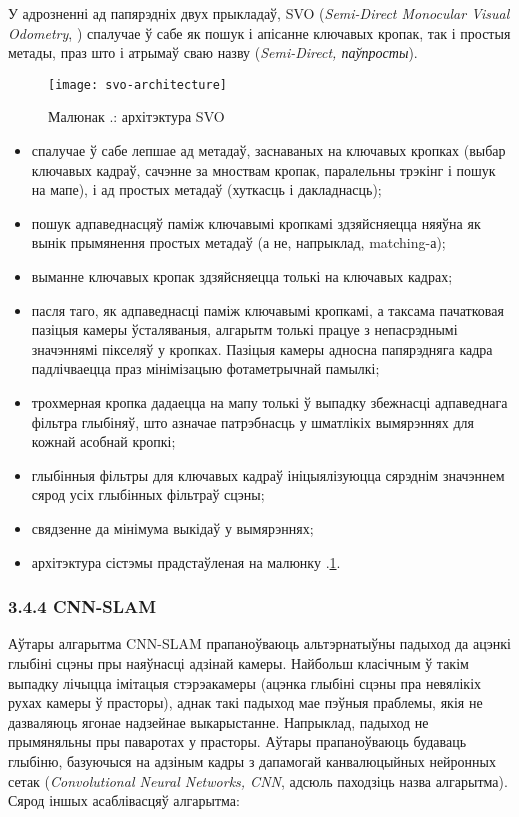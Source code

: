 У адрозненні ад папярэдніх двух прыкладаў, SVO (\textit{Semi-Direct Monocular Visual Odometry},
\cite{Forster2014ICRA}) спалучае ў сабе як пошук і апісанне ключавых кропак, так і
простыя метады, праз што і атрымаў сваю назву (\textit{Semi-Direct, паўпросты}).

\begin{figure}[H]
  \centering
  \texttt{[image: svo-architecture]}
  \captionsetup{labelformat=empty}
  \caption{Малюнак \cursection.: архітэктура SVO}
  \label{fig:svo-architecture}
\end{figure}

\begin{itemize}
  \item спалучае ў сабе лепшае ад метадаў, заснаваных на ключавых кропках (выбар
  ключавых кадраў, сачэнне за мноствам кропак, паралельны трэкінг і пошук на мапе),
  і ад простых метадаў (хуткасць і дакладнасць);
  \item пошук адпаведнасцяў паміж ключавымі кропкамі здзяйсняецца няяўна як вынік
  прымянення простых метадаў (а не, напрыклад, matching-а);
  \item выманне ключавых кропак здзяйсняецца толькі на ключавых кадрах;
  \item пасля таго, як адпаведнасці паміж ключавымі кропкамі, а таксама пачатковая пазіцыя
  камеры ўсталяваныя, алгарытм толькі працуе з непасрэднымі значэннямі пікселяў у кропках.
  Пазіцыя камеры адносна папярэдняга кадра падлічваецца праз мінімізацыю фотаметрычнай памылкі;
  \item трохмерная кропка дадаецца на мапу толькі ў выпадку збежнасці адпаведнага
  фільтра глыбіняў, што азначае патрэбнасць у шматлікіх вымярэннях для кожнай асобнай кропкі;
  \item глыбінныя фільтры для ключавых кадраў ініцыялізуюцца сярэднім значэннем
  сярод усіх глыбінных фільтраў сцэны;
  \item свядзенне да мінімума выкідаў у вымярэннях;
  \item архітэктура сістэмы прадстаўленая на малюнку \cursection.\ref{fig:svo-architecture}.
\end{itemize}

\renewcommand{\nextTitle}{3.4.4 CNN-SLAM}
\addcontentsline{toc}{subsubsection}{\nextTitle}
\subsubsection*{\nextTitle}

Аўтары алгарытма CNN-SLAM \cite{DBLP:journals/corr/TatenoTLN17} прапаноўваюць альтэрнатыўны падыход да ацэнкі
глыбіні сцэны пры наяўнасці адзінай камеры. Найбольш класічным ў такім выпадку лічыцца
імітацыя стэрэакамеры (ацэнка глыбіні сцэны пра невялікіх рухах камеры ў прасторы), аднак такі
падыход мае пэўныя праблемы, якія не дазваляюць ягонае надзейнае выкарыстанне. Напрыклад,
падыход не прымяняльны пры паваротах у прасторы. Аўтары прапаноўваюць будаваць глыбіню,
базуючыся на адзіным кадры з дапамогай канвалюцыйных нейронных сетак
(\textit{Convolutional Neural Networks, CNN}, адсюль паходзіць назва алгарытма).
Сярод іншых асаблівасцяў алгарытма:

